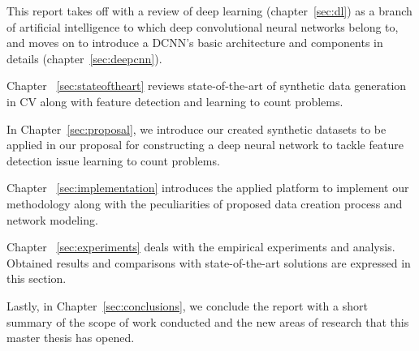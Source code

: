 This report takes off with a review of deep learning (chapter~\ref{sec:dl}) as a branch of artificial intelligence to which deep convolutional neural networks belong to, and moves on to introduce a DCNN's basic architecture and components in details (chapter~\ref{sec:deepcnn}). 


Chapter ~\ref{sec:stateoftheart} reviews state-of-the-art of synthetic data generation in CV along with feature detection and learning to count problems. 

In Chapter~\ref{sec:proposal}, we introduce our created synthetic datasets to be applied in our proposal for constructing a deep neural network to tackle feature detection issue learning to count problems. 

Chapter ~\ref{sec:implementation} introduces the applied platform to implement our methodology along with the peculiarities of proposed data creation process and network modeling. 

Chapter ~\ref{sec:experiments} deals with the empirical experiments and analysis. Obtained results and comparisons with state-of-the-art solutions are expressed in this section.

Lastly, in Chapter~\ref{sec:conclusions}, we conclude the report with a short summary of the scope of work conducted and the new areas of research that this master thesis has opened.
